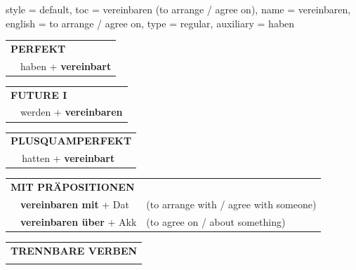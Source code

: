 \begin{verbentry}{
  style = {default},
  toc = {vereinbaren (to arrange / agree on)},
  name = {vereinbaren},
  english = {to arrange / agree on},
  type = {regular},
  auxiliary = {haben}
}
\vspace{10pt}

\begin{tabular}{rl}
\multicolumn{2}{l}{\textbf{PERFEKT}}\\
& haben + \textbf{vereinbart}\\
\end{tabular}
\hfill
\begin{tabular}{rl}
\multicolumn{2}{l}{\textbf{FUTURE I}}\\
& werden + \textbf{vereinbaren}\\
\end{tabular}
\hfill
\begin{tabular}{rl}
\multicolumn{2}{l}{\textbf{PLUSQUAMPERFEKT}}\\
& hatten + \textbf{vereinbart}\\
\end{tabular}

\vspace{10pt}

\begin{tabular}{lll}
\multicolumn{3}{l}{\textbf{MIT PRÄPOSITIONEN}}\\
& \textbf{vereinbaren mit} + Dat & (to arrange with / agree with someone)\\
& \textbf{vereinbaren über} + Akk & (to agree on / about something)\\
\end{tabular}
\hfill
\begin{tabular}{lll}
\multicolumn{3}{l}{\textbf{TRENNBARE VERBEN}}\\
\vspace{20pt}\end{tabular}
\vspace{-5pt}
\end{verbentry}

